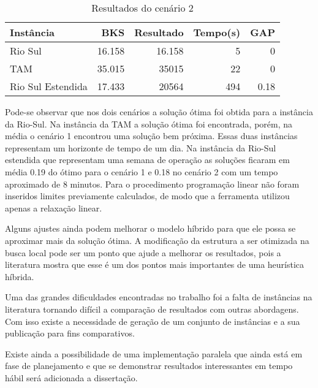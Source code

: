 \begin{table}[ht]
\caption{Resultados do cenário 2}\label{tab:cenario2}
\begin{center}


\begin{tabular}{l r r r r}
\hline

Instância & BKS & Resultado & Tempo(s) & GAP \\
\hline

Rio Sul & 16.158 & 16.158 & 5 & 0\\
TAM & 35.015 & 35015 & 22 & 0 \\
Rio Sul Estendida & 17.433 & 20564 & 494 & 0.18\\ 

\hline
\end{tabular}

\end{center}
\end{table}

	Pode-se observar que nos dois cenários a solução ótima foi obtida para a instância da Rio-Sul. Na instância da TAM a solução ótima foi encontrada, porém, na média o cenário 1 encontrou uma solução bem próxima. Essas duas instâncias representam um horizonte de tempo de um dia. Na instância da Rio-Sul estendida que representam uma semana de operação as soluções ficaram em média 0.19 do ótimo para o cenário 1 e 0.18 no cenário 2 com um tempo aproximado de 8 minutos. Para o procedimento programação linear não foram inseridos limites previamente calculados, de modo que a ferramenta utilizou apenas a relaxação linear.
  
 Alguns ajustes ainda podem melhorar o modelo híbrido para que ele possa se aproximar mais da solução ótima. A modificação da estrutura a ser otimizada na busca local pode ser um ponto que ajude a melhorar os resultados, pois a literatura mostra que esse é um dos pontos mais importantes de uma heurística híbrida.
 
 Uma das grandes dificuldades encontradas no trabalho foi a falta de instâncias na literatura tornando difícil a comparação de resultados com outras abordagens. Com isso existe a necessidade de geração de um conjunto de instâncias e a sua publicação para fins comparativos.
 
 Existe ainda a possibilidade de uma implementação paralela que ainda está em fase de planejamento e que se demonstrar resultados interessantes em tempo hábil será adicionada a dissertação.
 

